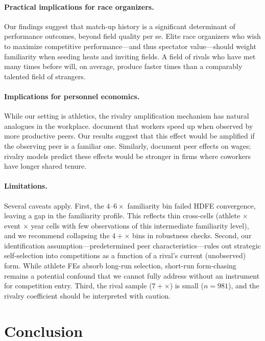 \documentclass[12pt]{article}
\theoremstyle{definition}
\theoremstyle{remark}
\begin{document}
\paragraph{Practical implications for race organizers.}
Our findings suggest that match-up history is a significant determinant of
performance outcomes, beyond field quality per se.
Elite race organizers who wish to maximize competitive performance---and thus
spectator value---should weight familiarity when seeding heats and inviting fields.
A field of rivals who have met many times before will, on average, produce
faster times than a comparably talented field of strangers.

\paragraph{Implications for personnel economics.}
While our setting is athletics, the rivalry amplification mechanism has natural
analogues in the workplace.
\citet{MasMoretti2009} document that workers speed up when observed by more
productive peers.
Our results suggest that this effect would be amplified if the observing peer is
a familiar one.
Similarly, \citet{CornelissenDustmannSchonberg2017} document peer effects on wages;
rivalry models predict these effects would be stronger in firms where coworkers
have longer shared tenure.

\paragraph{Limitations.}
Several caveats apply.
First, the $4$--$6\times$ familiarity bin failed HDFE convergence, leaving a gap
in the familiarity profile.
This reflects thin cross-cells (athlete $\times$ event $\times$ year cells with
few observations of this intermediate familiarity level), and we recommend
collapsing the $4+\times$ bins in robustness checks.
Second, our identification assumption---predetermined peer characteristics---rules
out strategic self-selection into competitions as a function of a rival's current
(unobserved) form.
While athlete FEs absorb long-run selection, short-run form-chasing remains a
potential confound that we cannot fully address without an instrument for
competition entry.
Third, the rival sample ($7+\times$) is small ($n = 981$), and the rivalry
coefficient should be interpreted with caution.

\section{Conclusion}
\label{sec:conclusion}
\end{document}
